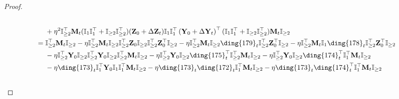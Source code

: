 \documentclass{article}
\theoremstyle{plain}
\theoremstyle{remark}
\def\bY{\mathbf{Y}}
\def\bZ{\mathbf{Z}}
\newcommand{\cc}[1]{\text{\ding{\number\numexpr#1 + 171\relax}}}
\begin{document}
\begin{proof}
\begin{align*}
        \\
        &~~~~
            + \eta^2 \mathbb{I}_{\ge2}^\top\mathbf{M}_{t}(\mathbb{I}_{1}\mathbb{I}_{1}^\top+\mathbb{I}_{\ge 2}\mathbb{I}_{\ge 2}^\top)(\bZ_0+\Delta\bZ_t)\mathbb{I}_{1}\mathbb{I}_{1}^\top\left(\bY_0+\Delta\bY_t\right)^\top (\mathbb{I}_{1}\mathbb{I}_{1}^\top+\mathbb{I}_{\ge 2}\mathbb{I}_{\ge 2}^\top)\mathbf{M}_{t}\mathbb{I}_{\ge 2}
        \\
        &= 
            \mathbb{I}_{\ge2}^\top\mathbf{M}_{t}\mathbb{I}_{\ge2} 
            - \eta\mathbb{I}_{\ge 2}^\top \mathbf{M}_{t}\mathbb{I}_{\ge 2}\mathbb{I}_{\ge 2}^\top\bZ_0\mathbb{I}_{\ge 2}\mathbb{I}_{\ge2}^\top \bZ_0^\top\mathbb{I}_{\ge2}
            - \eta\mathbb{I}_{\ge 2}^\top \mathbf{M}_{t}\mathbb{I}_{\ge 2}\cc{8}_t\mathbb{I}_{\ge2}^\top \bZ_0^\top\mathbb{I}_{\ge2}
            - \eta\mathbb{I}_{\ge 2}^\top \mathbf{M}_{t}\mathbb{I}_{1}\cc{7}_t\mathbb{I}_{\ge2}^\top \bZ_0^\top\mathbb{I}_{\ge2}
            \\
        &~~~~ 
            - \eta \mathbb{I}_{\ge2}^\top \bY_0 \mathbb{I}_{\ge2}\mathbb{I}_{\ge 2}^\top \bY_0\mathbb{I}_{\ge 2}\mathbb{I}_{\ge 2}^\top\mathbf{M}_{t} \mathbb{I}_{\ge 2}
            - \eta \mathbb{I}_{\ge2}^\top \bY_0 \mathbb{I}_{\ge2}\cc{4}_t^\top\mathbb{I}_{\ge 2}^\top\mathbf{M}_{t} \mathbb{I}_{\ge 2} 
            - \eta \mathbb{I}_{\ge2}^\top \bY_0 \mathbb{I}_{\ge2}\cc{3}_t^\top\mathbb{I}_{1}^\top\mathbf{M}_{t} \mathbb{I}_{\ge 2}
         \\
        &~~~~ 
            -\eta \cc{2}_t \mathbb{I}_{1}^\top\bY_0\mathbb{I}_{1}\mathbb{I}_{1}^\top\mathbf{M}_{t}\mathbb{I}_{\ge 2} 
            -\eta \cc{2}_t \cc{1}_t\mathbb{I}_{1}^\top\mathbf{M}_{t}\mathbb{I}_{\ge 2} 
            -\eta \cc{2}_t \cc{3}_t^\top\mathbb{I}_{1}^\top\mathbf{M}_{t}\mathbb{I}_{\ge 2} 
        \\
        &~~~~ 

\end{align*}
\end{proof}
\end{document}
